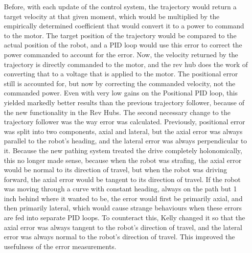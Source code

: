 \documentclass{article}
\begin{document}
Before, with each update of the control system, the trajectory would return a target velocity at that given moment, which would be multiplied by the empirically determined coefficient that would convert it to a power to command to the motor. The target position of the trajectory would be compared to the actual position of the robot, and a PID loop would use this error to correct the power commanded to account for the error. Now, the velocity returned by the trajectory is directly commanded to the motor, and the rev hub does the work of converting that to a voltage that is applied to the motor. The positional error still is accounted for, but now by correcting the commanded velocity, not the commanded power. Even with very low gains on the Positional PID loop, this yielded markedly better results than the previous trajectory follower, because of the new functionality in the Rev Hubs. The second necessary change to the trajectory follower was the way error was calculated. Previously, positional error was split into two components, axial and lateral, but the axial error was always parallel to the robot's heading, and the lateral error was always perpendicular to it. Because the new pathing system treated the drive completely holonomically, this no longer made sense, because when the robot was strafing, the axial error would be normal to its direction of travel, but when the robot was driving forward, the axial error would be tangent to its direction of travel. If the robot was moving through a curve with constant heading, always on the path but 1 inch behind where it wanted to be, the error would first be primarily axial, and then primarily lateral, which would cause strange behaviours when these errors are fed into separate PID loops. To counteract this, Kelly changed it so that the axial error was always tangent to the robot's direction of travel, and the lateral error was always normal to the robot's direction of travel. This improved the usefulness of the error measurements.
\end{document}
